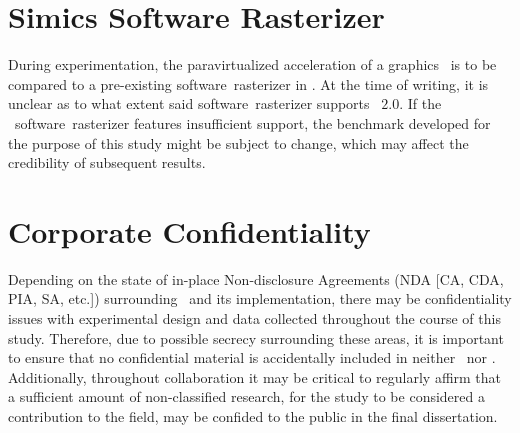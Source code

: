 
\section{Simics Software Rasterizer}
\label{sec:risksandliabilities_simicssoftwarerasterizer}
During experimentation, the paravirtualized acceleration of a graphics \termapi\ is to be compared to a pre-existing software~rasterizer in \termsimics .
At the time of writing, it is unclear as to what extent said software~rasterizer supports \termopengles ~$2.0$.
If the \termsimics\ software~rasterizer features insufficient support, the benchmark developed for the purpose of this study might be subject to change, which may affect the credibility of subsequent results.



\section{Corporate Confidentiality}
\label{sec:risksandliabilities_corporateconfidentiality}
Depending on the state of in-place Non-disclosure Agreements (NDA [CA, CDA, PIA, SA, etc.]) surrounding \termsimics\ and its implementation, there may be confidentiality issues with experimental design and data collected throughout the course of this study.
Therefore, due to possible secrecy surrounding these areas, it is important to ensure that no confidential material is accidentally included in neither \termproposal\ nor \termthesis .
Additionally, throughout collaboration it may be critical to regularly affirm that a sufficient amount of non-classified research, for the study to be considered a contribution to the field, may be confided to the public in the final dissertation.

